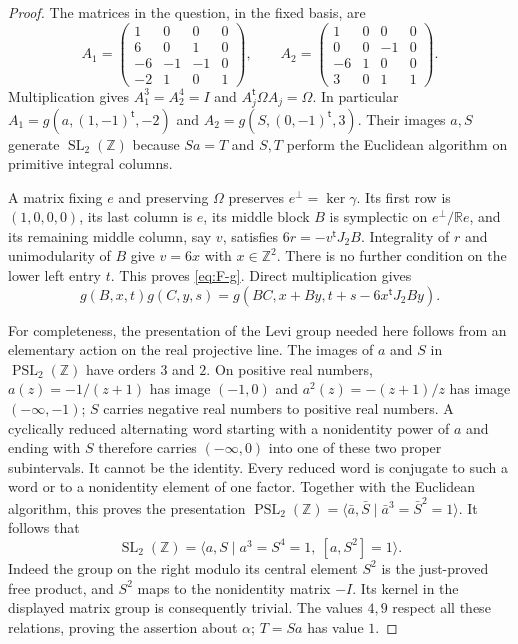 \begin{proof}
The matrices in the question, in the fixed basis, are
\[
 A_1=\begin{pmatrix}1&0&0&0\\6&0&1&0\\-6&-1&-1&0\\-2&1&0&1\end{pmatrix},
 \qquad
 A_2=\begin{pmatrix}1&0&0&0\\0&0&-1&0\\-6&1&0&0\\3&0&1&1\end{pmatrix}.
\]
Multiplication gives $A_1^3=A_2^4=I$ and
$A_j^{\mathsf t}\Omega A_j=\Omega$.  In particular
$A_1=g(a,(1,-1)^{\mathsf t},-2)$ and
$A_2=g(S,(0,-1)^{\mathsf t},3)$.  Their images $a,S$ generate
$\operatorname{SL}_2(\mathbb Z)$ because $Sa=T$ and $S,T$ perform the
Euclidean algorithm on primitive integral columns.

A matrix fixing $e$ and preserving $\Omega$ preserves
$e^{\perp}=\ker\gamma$.  Its first row is $(1,0,0,0)$, its last column is
$e$, its middle block $B$ is symplectic on
$e^{\perp}/\mathbb Re$, and its remaining middle column, say $v$, satisfies
$6r=-v^{\mathsf t}J_2B$.  Integrality of $r$ and unimodularity of $B$
give $v=6x$ with $x\in\mathbb Z^2$.  There is no further condition on
the lower left entry $t$.  This proves \eqref{eq:F-g}.  Direct multiplication
gives
\begin{equation}\label{eq:F-law}
 g(B,x,t)g(C,y,s)
 =g(BC,x+By,t+s-6x^{\mathsf t}J_2By).
\end{equation}

For completeness, the presentation of the Levi group needed here follows
from an elementary action on the real projective line.  The images of $a$
and $S$ in $\operatorname{PSL}_2(\mathbb Z)$ have orders $3$ and $2$.
On positive real numbers, $a(z)=-1/(z+1)$ has image $(-1,0)$ and
$a^2(z)=-(z+1)/z$ has image $(-\infty,-1)$; $S$ carries negative real
numbers to positive real numbers.  A cyclically reduced alternating word
starting with a nonidentity power of $a$ and ending with $S$ therefore
carries $(-\infty,0)$ into one of these two proper subintervals.  It cannot
be the identity.  Every reduced word is conjugate to such a word or to a
nonidentity element of one factor.  Together with the Euclidean algorithm,
this proves the presentation
$\operatorname{PSL}_2(\mathbb Z)=\langle\bar a,\bar S\mid
\bar a^3=\bar S^2=1\rangle$.  It follows that
\begin{equation}\label{eq:F-SLpresentation}
 \operatorname{SL}_2(\mathbb Z)=
 \langle a,S\mid a^3=S^4=1,\ [a,S^2]=1\rangle.
\end{equation}
Indeed the group on the right modulo its central element $S^2$ is the
just-proved free product, and $S^2$ maps to the nonidentity matrix $-I$.
Its kernel in the displayed matrix group is consequently trivial.
The values $4,9$ respect all these relations, proving the assertion about
$\alpha$; $T=Sa$ has value $1$.


\end{proof}
